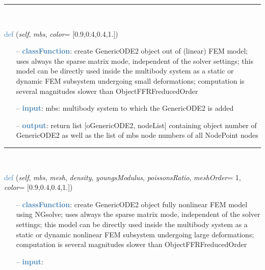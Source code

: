 \begin{itemize}[leftmargin=1.4cm]
\begin{itemize}[leftmargin=1.4cm]
\begin{itemize}[leftmargin=0.5cm]
\begin{itemize}[leftmargin=1.4cm]
\begin{itemize}[leftmargin=1.4cm]
\begin{itemize}[leftmargin=0.5cm]
%
\noindent\rule{8cm}{0.75pt}\vspace{1pt} \\ 
\begin{flushleft}
\noindent \textcolor{steelblue}{def {\bf {}}}\label{sec:FEM:FEMinterface:CreateLinearFEMObjectGenericODE2}
({\it self}, {\it mbs}, {\it color}= [0.9,0.4,0.4,1.])
\end{flushleft}
\setlength{\itemindent}{0.7cm}
\begin{itemize}[leftmargin=0.7cm]
  \item[--]  \textcolor{steelblue}{\bf classFunction}: create GenericODE2 object out of (linear) FEM model; uses always the sparse matrix mode, independent of the solver settings; this model can be directly used inside the multibody system as a static or dynamic FEM subsystem undergoing small deformations; computation is several magnitudes slower than ObjectFFRFreducedOrder  \item[--]  \textcolor{steelblue}{\bf input}: mbs: multibody system to which the GenericODE2 is added  \item[--]  \textcolor{steelblue}{\bf output}: return list [oGenericODE2, nodeList] containing object number of GenericODE2 as well as the list of mbs node numbers of all NodePoint nodes\vspace{12pt}\end{itemize}
%
\noindent\rule{8cm}{0.75pt}\vspace{1pt} \\ 
\begin{flushleft}
\noindent \textcolor{steelblue}{def {\bf {}}}\label{sec:FEM:FEMinterface:CreateNonlinearFEMObjectGenericODE2NGsolve}
({\it self}, {\it mbs}, {\it mesh}, {\it density}, {\it youngsModulus}, {\it poissonsRatio}, {\it meshOrder}= 1, {\it color}= [0.9,0.4,0.4,1.])
\end{flushleft}
\setlength{\itemindent}{0.7cm}
\begin{itemize}[leftmargin=0.7cm]
  \item[--]  \textcolor{steelblue}{\bf classFunction}: create GenericODE2 object fully nonlinear FEM model using NGsolve; uses always the sparse matrix mode, independent of the solver settings; this model can be directly used inside the multibody system as a static or dynamic nonlinear FEM subsystem undergoing large deformations; computation is several magnitudes slower than ObjectFFRFreducedOrder  \item[--]  \textcolor{steelblue}{\bf input}: \vspace{-6pt}

\end{itemize}
\end{itemize}
\end{itemize}
\end{itemize}
\end{itemize}
\end{itemize}
\end{itemize}
